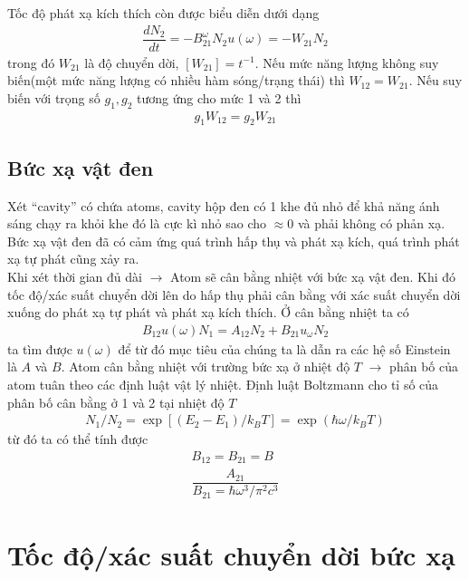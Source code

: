 \documentclass{report}
\newcommand{\q}[1]{``#1''
}
\newcommand{\f}[2]{\dfrac{#1}{#2}}
\begin{document}
Tốc độ phát xạ kích thích còn được biểu diễn dưới dạng
\begin{gather}
	\f{dN_{2}}{dt} = - B_{21}^{\omega} N_{2} u(\omega) = - W_{21} N_{2}
\end{gather}
trong đó $W_{21}$ là độ chuyển dời, $\left[W_{21}\right] = t^{-1}$. Nếu mức năng lượng không suy biến(một mức năng lượng có nhiều hàm sóng/trạng thái) thì $W_{12} = W_{21}$. Nếu suy biến với trọng số $g_{1}, g_{2}$ tương ứng cho mức 1 và 2 thì 
\begin{gather}
	g_{1} W_{12} = g_{2} W_{21}
\end{gather}
\subsection{Bức xạ vật đen}
Xét \q{cavity} có chứa atoms, cavity hộp đen có 1 khe đủ nhỏ để khả năng ánh sáng chạy ra khỏi khe đó là cực kì nhỏ sao cho $\approx 0$ và phải không có phản xạ. Bức xạ vật đen đã có cảm ứng quá trình hấp thụ và phát xạ kích, quá trình phát xạ tự phát cũng xảy ra. \\
Khi xét thời gian đủ dài $\rightarrow$ Atom sẽ cân bằng nhiệt với bức xạ vật đen. Khi đó tốc độ/xác suất chuyển dời lên do hấp thụ phải cân bằng với xác suất chuyển dời xuống do phát xạ tự phát và phát xạ kích thích. Ở cân bằng nhiệt ta có
\begin{gather}
	B_{12} u(\omega) N_{1} = A_{12} N_{2} + B_{21} u_{\omega} N_{2}
\end{gather}
ta tìm được $u(\omega)$ để từ đó mục tiêu của chúng ta là dẫn ra các hệ số Einstein là $A$ và $B$. Atom cân bằng nhiệt với trường bức xạ ở nhiệt độ $T$ $\rightarrow$ phân bố của atom tuân theo các định luật vật lý nhiệt. Định luật Boltzmann cho tỉ số của phân bố cân bằng ở 1 và 2 tại nhiệt độ $T$
\begin{gather}
	N_{1} / N_{2} = \exp[(E_{2} -  E_{1}) / k_{B} T] = \exp(\hbar \omega / k_{B} T)
\end{gather}
từ đó ta có thể tính được
\begin{gather}
	B_{12} = B_{21} = B\\
	\f{A_{21}}{B_{21} = \hbar \omega^{3} / \pi^{2} c^{3}}
\end{gather}
\section{Tốc độ/xác suất chuyển dời bức xạ}
\end{document}
